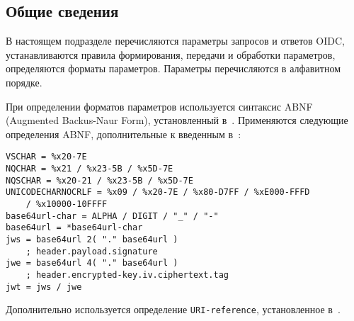 \label{PARAMS}

\subsection{Общие сведения}\label{PARAMS.Syntax}

В настоящем подразделе перечисляются параметры запросов и ответов OIDC, 
устанавливаются правила формирования, передачи и обработки параметров, 
определяются форматы параметров.
%
Параметры перечисляются в алфавитном порядке.

При определении форматов параметров используется синтаксис ABNF (Augmented 
Backus-Naur Form), установленный в~\cite{RFC5234}. 
%
Применяются следующие определения ABNF, дополнительные к 
введенным в~\cite{RFC5234}:
%
\begin{lstlisting}
VSCHAR = %x20-7E
NQCHAR = %x21 / %x23-5B / %x5D-7E
NQSCHAR = %x20-21 / %x23-5B / %x5D-7E
UNICODECHARNOCRLF = %x09 / %x20-7E / %x80-D7FF / %xE000-FFFD 
    / %x10000-10FFFF
base64url-char = ALPHA / DIGIT / "_" / "-"
base64url = *base64url-char
jws = base64url 2( "." base64url )
    ; header.payload.signature
jwe = base64url 4( "." base64url )
    ; header.encrypted-key.iv.ciphertext.tag
jwt = jws / jwe
\end{lstlisting}

Дополнительно используется определение \lstinline{URI-reference}, 
установленное в~\cite{RFC3986}.


